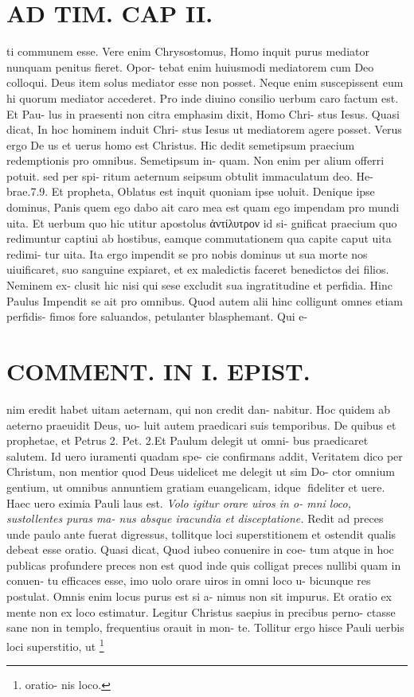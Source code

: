 \documentclass{article}
\begin{document}
\begin{pages}
\section*{AD TIM. CAP II. }
\marginpar{[ p.117 ]}\pstart ti communem esse. Vere enim Chrysostomus, Homo inquit purus mediator nunquam penitus fieret. Opor- tebat enim huiusmodi mediatorem cum Deo colloqui. Deus item solus mediator esse non posset. Neque enim suscepissent eum hi quorum mediator accederet. Pro inde diuino consilio uerbum caro factum est. Et Pau- lus in praesenti non citra emphasim dixit, Homo Chri- stus Iesus. Quasi dicat, In hoc hominem induit Chri- stus Iesus ut mediatorem agere posset. Verus ergo De us et uerus homo est Christus. Hic dedit semetipsum praecium redemptionis pro omnibus. Semetipsum in- quam. Non enim per alium offerri potuit. sed per spi- ritum aeternum seipsum obtulit immaculatum deo. He- brae.7.9. Et propheta, Oblatus est inquit quoniam ipse uoluit. Denique ipse dominus, Panis quem ego dabo ait caro mea est quam ego impendam pro mundi uita. Et uerbum quo hic utitur apostolus ἀντίλυτρον id si- gnificat praecium quo redimuntur captiui ab hostibus, eamque commutationem qua capite caput uita redimi- tur uita. Ita ergo impendit se pro nobis dominus ut sua morte nos uiuificaret, suo sanguine expiaret, et ex maledictis faceret benedictos dei filios. Neminem ex- clusit hic nisi qui sese excludit sua ingratitudine et perfidia. Hinc Paulus Impendit se ait pro omnibus. Quod autem alii hinc colligunt omnes etiam perfidis- fimos fore saluandos, petulanter blasphemant. Qui e-  \pend
\section*{COMMENT. IN I. EPIST. }\pstart nim eredit habet uitam aeternam, qui non credit dan- nabitur. Hoc quidem ab aeterno praeuidit Deus, uo- luit autem praedicari suis temporibus. De quibus et prophetae, et Petrus 2. Pet. 2.Et Paulum delegit ut omni- bus praedicaret salutem. Id uero iuramenti quadam spe- cie confirmans addit, Veritatem dico per Christum, non mentior quod Deus uidelicet me delegit ut sim Do- ctor omnium gentium, ut omnibus annuntiem gratiam euangelicam, idque fideliter et uere. Haec uero eximia Pauli laus est.  \pend
\textit{Volo igitur orare uiros in o- mni loco, sustollentes puras ma- nus absque iracundia et disceptatione. }\pstart Redit ad preces unde paulo ante fuerat digressus, tollitque loci superstitionem et ostendit qualis debeat esse oratio. Quasi dicat, Quod iubeo conuenire in coe- tum atque in hoc publicas profundere preces non est quod inde quis colligat preces nullibi quam in conuen- tu efficaces esse, imo uolo orare uiros in omni loco u- bicunque res postulat. Omnis enim locus purus est si a- nimus non sit impurus. Et oratio ex mente non ex loco estimatur. Legitur Christus saepius in precibus perno- ctasse sane non in templo, frequentius orauit in mon- te. Tollitur ergo hisce Pauli uerbis loci superstitio, ut  \pend\footnote{\footnotesizeDe oratio- nis loco. }

\end{pages}
\end{document}
